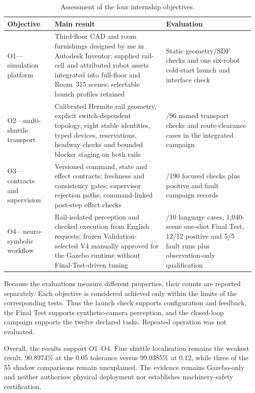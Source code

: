 \begin{table}[H]
\centering
\small
\caption{Assessment of the four internship objectives.}
\label{tab:objective-results}
\begin{tabularx}{\textwidth}{@{}
>{\raggedright\arraybackslash}p{}
>{\raggedright\arraybackslash}X
>{\raggedright\arraybackslash}p{}@{}}
\toprule
\textbf{Objective} & \textbf{Main result} & \textbf{Evaluation}\\
\midrule
O1---simulation platform & Third-floor CAD and room furnishings designed by me
in Autodesk Inventor; supplied rail-cell and attributed robot assets integrated
into full-floor and Room~315 scenes; selectable launch profiles retained &
Static geometry/SDF checks and one six-robot cold-start launch and interface
check\\
\tablerowrule
O2---multi-shuttle transport & Calibrated Hermite rail geometry, explicit
switch-dependent topology, eight stable identities, typed devices, reservations,
headway checks and bounded blocker staging on both rails & 96/96 named transport
checks and route-clearance cases in the integrated campaign\\
\tablerowrule
O3---contracts and supervision & Versioned command, state and effect contracts;
freshness and consistency gates; supervisor rejection paths; command-linked
post-step effect checks & 190/190 focused checks plus positive and fault campaign
records\\
\tablerowrule
O4---neuro-symbolic workflow & Rail-isolated perception and checked execution
from English requests; frozen Validation-selected V4 manually approved for the
Gazebo runtime without Final-Test-driven tuning & 10/10 language cases,
1,040-scene one-shot Final Test, 12/12 positive and 5/5 fault runs plus
observation-only qualification\\
\bottomrule
\end{tabularx}
\end{table}

Because the evaluations measure different properties, their counts are reported
separately. Each objective is considered achieved only within the limits of the
corresponding tests. Thus the launch check supports configuration and feedback,
the Final Test supports synthetic-camera perception, and the closed-loop
campaign supports the twelve declared tasks. Repeated operation was not
evaluated.

Overall, the results support O1--O4. Fine shuttle localisation remains the
weakest result:
90.8974\% at the 0.05 tolerance versus 99.0385\% at 0.12, while three of the 55
shadow comparisons remain unexplained. The evidence remains Gazebo-only and
neither authorises physical deployment nor establishes machinery-safety
certification.
